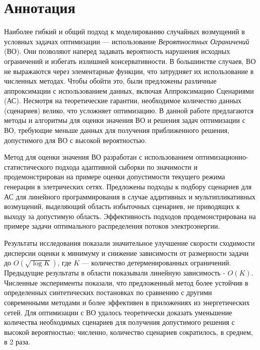 \chapter*{Аннотация}

Наиболее гибкий и общий подход к моделированию случайных возмущений в условных задачах оптимизации — использование \emph{Вероятностных Ограничений} (ВО). Они позволяют наперед задавать вероятность нарушения исходных ограничений и избегать излишней консервативности. В большинстве случаев, ВО не выражаются через элементарные функции, что затрудняет их использование в численных методах. Чтобы обойти это, были предложены различные аппроксимации с использованием данных, включая Аппроксимацию Сценариями (АС). Несмотря на теоретические гарантии, необходимое количество данных (сценариев) велико, что усложняет оптимизацию. В данной работе предлагаются методы и алгоритмы для оценки значения ВО и решения задач оптимизации с ВО, требующие меньше данных для получения приближенного решения, допустимого для ВО с высокой вероятностью.

Метод для оценки значения ВО  разработан с использованием оптимизационно-статистического подхода адаптивной сыборки по значимости и продемонстрирован на примере оценки допустимости текущего режима генерации в элетрических сетях. Предложены подходы к подбору сценариев для АС для линейного программирования в случае аддитивных и мультипликативных возмущений, выделяющий область избыточных сценариев, не приводящих к выходу за допустимую область. Эффективность подходов продемонстрирована на примере задачи оптимального распределения потоков электроэнергии.

Результаты исследования показали значительное улучшение скорости сходимости дисперсии оценки к минимуму и снижение зависимости от размерности задачи до $O(\sqrt{\log K})$, где $K$ — количество детерменированных ограничений. Предыдущие результаты в области показывали линейную зависимость - $O(K)$. Численные эксперименты показали, что предложенный метод более устойчив в определенных синтетических постановках по сравнению с другими современными методами и более эффективен в приложениях из энергетических сетей. Для оптимизации с ВО удалось теоретически доказать уменьшение количества необходимых сценариев для получения допустимого решения с высокой вероятностью; численно, количество сценариев сократилось, в среднем, в 2 раза.